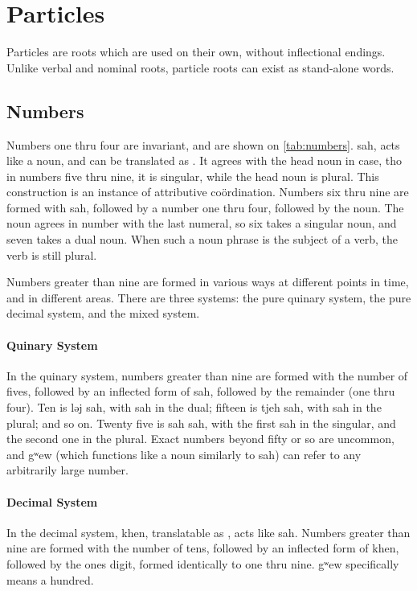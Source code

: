 \section{Particles}
Particles are roots which are used on their own, without inflectional endings.
Unlike verbal and nominal roots, particle roots can exist as stand-alone words.

\subsection{Numbers}
Numbers one thru four are invariant, and are shown on \cref{tab:numbers}. {\ll
    sah}, acts like a noun, and can be translated as . It
agrees with the head noun in case, tho in numbers five thru nine, it is
singular, while the head noun is plural. This construction is an instance of
attributive coördination. Numbers six thru nine are formed with {\ll sah},
followed by a number one thru four, followed by the noun. The noun agrees in
number with the last numeral, so six takes a singular noun, and seven takes a
dual noun. When such a noun phrase is the subject of a verb, the verb is still
plural.

Numbers greater than nine are formed in various ways at different points in
time, and in different areas. There are three systems: the pure quinary system,
the pure decimal system, and the mixed system.

\paragraph{Quinary System} In the quinary system, numbers greater than nine are
formed with the number of fives, followed by an inflected form of {\ll sah},
followed by the remainder (one thru four). Ten is {\ll ləj sah}, with {\ll sah}
in the dual; fifteen is {\ll tjeh sah}, with {\ll sah} in the plural; and so
on. Twenty five is {\ll sah sah}, with the first {\ll sah} in the singular, and
the second one in the plural. Exact numbers beyond fifty or so are uncommon,
and {\ll gʷew} (which functions like a noun similarly to {\ll sah}) can refer
to any arbitrarily large number.

\paragraph{Decimal System} In the decimal system, {\ll khen}, translatable as
, acts like {\ll sah}. Numbers greater than nine are formed
with the number of tens, followed by an inflected form of {\ll khen}, followed
by the ones digit, formed identically to one thru nine. {\ll gʷew} specifically
means a hundred.


